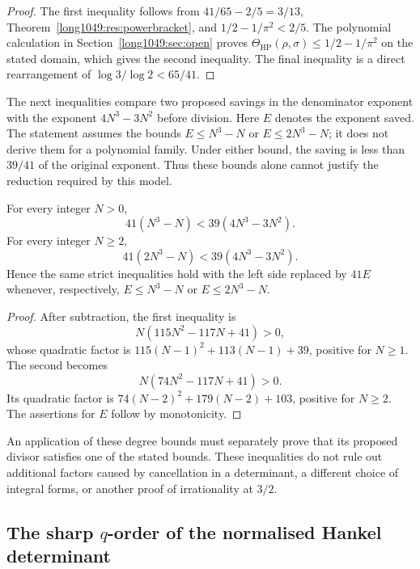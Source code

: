 \documentclass[11pt]{article}
\begin{document}
\begin{proof}
The first inequality follows from
$41/65-2/5=3/13$, Theorem~\ref{long1049:res:powerbracket}, and
$1/2-1/\pi^2<2/5$. The polynomial calculation in
Section~\ref{long1049:sec:open} proves
$\Theta_{\mathrm{HP}}(\rho,\sigma)\le1/2-1/\pi^2$ on the stated
domain, which gives the second inequality.  The final inequality is a direct
rearrangement of $\log3/\log2<65/41$.
\end{proof}

The next inequalities compare two proposed savings in the denominator
exponent with the exponent $4N^3-3N^2$ before division. Here $E$ denotes
the exponent saved. The statement assumes the bounds $E\le N^3-N$ or
$E\le2N^3-N$; it does not derive them for a polynomial family. Under either
bound, the saving is less than $39/41$ of the original exponent. Thus
these bounds alone cannot justify the reduction required by this model.

\begin{theorem}\label{long1049:res:chargeceilings}
For every integer $N>0$,
\[
 41(N^3-N)<39(4N^3-3N^2).
\]
For every integer $N\ge2$,
\[
 41(2N^3-N)<39(4N^3-3N^2).
\]
Hence the same strict inequalities hold with the left side replaced by
$41E$ whenever, respectively, $E\le N^3-N$ or $E\le2N^3-N$.
\end{theorem}

\begin{proof}
After subtraction, the first inequality is
\[
 N(115N^2-117N+41)>0,
\]
whose quadratic factor is $115(N-1)^2+113(N-1)+39$, positive for
$N\ge1$. The second becomes
\[
 N(74N^2-117N+41)>0.
\]
Its quadratic factor is $74(N-2)^2+179(N-2)+103$, positive for
$N\ge2$. The assertions for $E$ follow by monotonicity.
\end{proof}

An application of these degree bounds must separately
prove that its proposed divisor satisfies one of the stated bounds.
These inequalities do not rule out additional factors caused by
cancellation in a determinant, a different choice of integral forms,
or another proof of irrationality at $3/2$.

\subsection{The sharp \texorpdfstring{$q$}{q}-order of the normalised Hankel
determinant}\label{long1049:sec:hankel-order}
\end{document}
